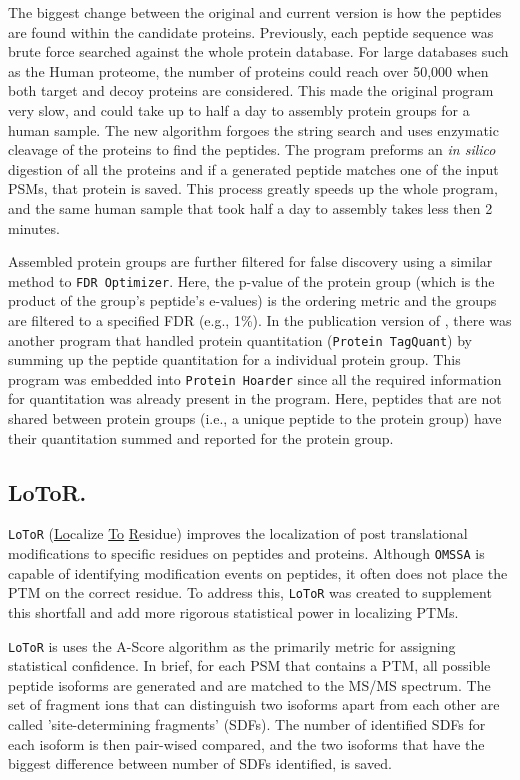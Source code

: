 The biggest change between the original and current version is how the peptides are found within the candidate proteins. Previously, each peptide sequence was brute force searched against the whole protein database. For large databases such as the Human proteome, the number of proteins could reach over 50,000 when both target and decoy proteins are considered. This made the original program very slow, and could take up to half a day to assembly protein groups for a human sample. The new algorithm forgoes the string search and uses enzymatic cleavage of the proteins to find the peptides. The program preforms an \emph{in silico} digestion of all the proteins and if a generated peptide matches one of the input PSMs, that protein is saved. This process greatly speeds up the whole program, and the same human sample that took half a day to assembly takes less then 2 minutes. 

Assembled protein groups are further filtered for false discovery using a similar method to \texttt{FDR Optimizer}. Here, the p-value of the protein group (which is the product of the group's peptide's e-values) is the ordering metric and the groups are filtered to a specified FDR (e.g., 1\%). In the publication version of \compass{}, there was another program that handled protein quantitation (\texttt{Protein TagQuant}) by summing up the peptide quantitation for a individual protein group. This program was embedded into \texttt{Protein Hoarder} since all the required information for quantitation was already present in the program. Here, peptides that are not shared between protein groups (i.e., a unique peptide to the protein group) have their quantitation summed and reported for the protein group.

\subsection*{LoToR.}
\texttt{LoToR} (\underline{Lo}calize \underline{To} \underline{R}esidue) improves the localization of post translational modifications to specific residues on peptides and proteins. Although \texttt{OMSSA} is capable of identifying modification events on peptides, it often does not place the PTM on the correct residue. To address this, \texttt{LoToR} was created to supplement this shortfall and add more rigorous statistical power in localizing PTMs. 

\texttt{LoToR} is uses the A-Score algorithm as the primarily metric for assigning statistical confidence.\cite{ascore} In brief, for each PSM that contains a PTM, all possible peptide isoforms are generated and are matched to the MS/MS spectrum. The set of fragment ions that can distinguish two isoforms apart from each other are called 'site-determining fragments' (SDFs). The number of identified SDFs for each isoform is then pair-wised compared, and the two isoforms that have the biggest difference between number of SDFs identified, is saved.

